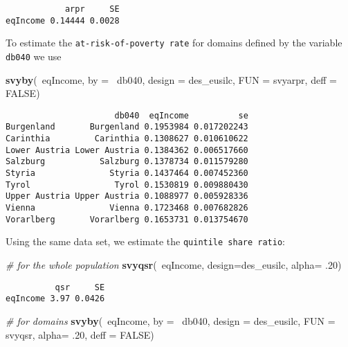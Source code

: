 \documentclass[]{book}
\newenvironment{Shaded}{\begin{snugshade}}{\end{snugshade}}
\newcommand{\KeywordTok}[1]{\textcolor[rgb]{0.13,0.29,0.53}{\textbf{{#1}}}}
\newcommand{\DataTypeTok}[1]{\textcolor[rgb]{0.13,0.29,0.53}{{#1}}}
\newcommand{\DecValTok}[1]{\textcolor[rgb]{0.00,0.00,0.81}{{#1}}}
\newcommand{\CommentTok}[1]{\textcolor[rgb]{0.56,0.35,0.01}{\textit{{#1}}}}
\newcommand{\OtherTok}[1]{\textcolor[rgb]{0.56,0.35,0.01}{{#1}}}
\newcommand{\NormalTok}[1]{{#1}}
\begin{document}
\begin{verbatim}
            arpr     SE
eqIncome 0.14444 0.0028
\end{verbatim}

To estimate the \texttt{at-risk-of-poverty\ rate} for domains defined by
the variable \texttt{db040} we use

\begin{Shaded}
\begin{Highlighting}[]
\KeywordTok{svyby}\NormalTok{(~eqIncome, }\DataTypeTok{by =} \NormalTok{~db040, }\DataTypeTok{design =} \NormalTok{des_eusilc, }\DataTypeTok{FUN =} \NormalTok{svyarpr, }\DataTypeTok{deff =} \OtherTok{FALSE}\NormalTok{)}
\end{Highlighting}
\end{Shaded}

\begin{verbatim}
                      db040  eqIncome          se
Burgenland       Burgenland 0.1953984 0.017202243
Carinthia         Carinthia 0.1308627 0.010610622
Lower Austria Lower Austria 0.1384362 0.006517660
Salzburg           Salzburg 0.1378734 0.011579280
Styria               Styria 0.1437464 0.007452360
Tyrol                 Tyrol 0.1530819 0.009880430
Upper Austria Upper Austria 0.1088977 0.005928336
Vienna               Vienna 0.1723468 0.007682826
Vorarlberg       Vorarlberg 0.1653731 0.013754670
\end{verbatim}

Using the same data set, we estimate the
\texttt{quintile\ share\ ratio}:

\begin{Shaded}
\begin{Highlighting}[]
\CommentTok{# for the whole population}
\KeywordTok{svyqsr}\NormalTok{(~eqIncome, }\DataTypeTok{design=}\NormalTok{des_eusilc, }\DataTypeTok{alpha=} \NormalTok{.}\DecValTok{20}\NormalTok{)}
\end{Highlighting}
\end{Shaded}

\begin{verbatim}
          qsr     SE
eqIncome 3.97 0.0426
\end{verbatim}

\begin{Shaded}
\begin{Highlighting}[]
\CommentTok{# for domains}
\KeywordTok{svyby}\NormalTok{(~eqIncome, }\DataTypeTok{by =} \NormalTok{~db040, }\DataTypeTok{design =} \NormalTok{des_eusilc,}
  \DataTypeTok{FUN =} \NormalTok{svyqsr, }\DataTypeTok{alpha=} \NormalTok{.}\DecValTok{20}\NormalTok{, }\DataTypeTok{deff =} \OtherTok{FALSE}\NormalTok{)}
\end{Highlighting}
\end{Shaded}
\end{document}
